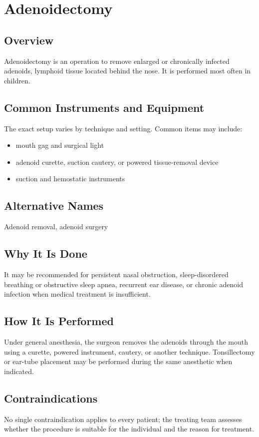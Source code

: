 \chapter{Adenoidectomy}

\section*{Overview}
Adenoidectomy is an operation to remove enlarged or chronically infected adenoids, lymphoid tissue located behind the nose. It is performed most often in children.

\section*{Common Instruments and Equipment}
The exact setup varies by technique and setting. Common items may include:
\begin{itemize}[nosep,leftmargin=*]
  \item mouth gag and surgical light
  \item adenoid curette, suction cautery, or powered tissue-removal device
  \item suction and hemostatic instruments
\end{itemize}

\section*{Alternative Names}
Adenoid removal, adenoid surgery

\section*{Why It Is Done}
It may be recommended for persistent nasal obstruction, sleep-disordered breathing or obstructive sleep apnea, recurrent ear disease, or chronic adenoid infection when medical treatment is insufficient.

\section*{How It Is Performed}
Under general anesthesia, the surgeon removes the adenoids through the mouth using a curette, powered instrument, cautery, or another technique. Tonsillectomy or ear-tube placement may be performed during the same anesthetic when indicated.

\section*{Contraindications}
No single contraindication applies to every patient; the treating team assesses whether the procedure is suitable for the individual and the reason for treatment.

